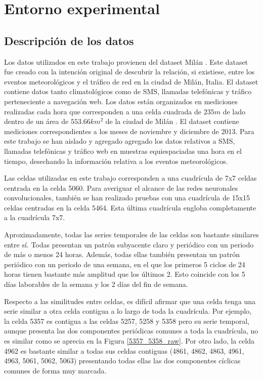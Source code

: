 \chapter{Entorno experimental}
\label{cap7:entorno}
\section{Descripción de los datos}
Los datos utilizados en este trabajo provienen del dataset Milán \cite{milandataset}. Este dataset fue creado con la intención original de descubrir la relación, si existiese, entre los eventos meteorológicos y el tráfico de red en la ciudad de Milán, Italia. El dataset contiene datos tanto climatológicos como de SMS, llamadas telefónicas y tráfico perteneciente a navegación web. Los datos están organizados en mediciones realizadas cada hora que corresponden a una celda cuadrada de $235 m$ de lado dentro de un área de $553.66km^2$ de la ciudad de Milán \cite{milanogrid}. El dataset contiene mediciones correspondientes a los meses de noviembre y diciembre de 2013. Para este trabajo se han aislado y agregado agregado los datos relativos a SMS, llamadas telefónicas y tráfico web en muestras equiespaciadas una hora en el tiempo, desechando la información relativa a los eventos meteorológicos.

Las celdas utilizadas en este trabajo corresponden a una cuadrícula de 7x7 celdas centrada en la celda 5060. Para averiguar el alcance de las redes neuronales convolucionales, también se han realizado pruebas con una cuadrícula de 15x15 celdas centradas en la celda 5464. Esta última cuadrícula engloba completamente a la cuadrícula 7x7.

Aproximadamente, todas las series temporales de las celdas son bastante similares entre sí. Todas presentan un patrón subyacente claro y periódico con un periodo de más o menos 24 horas. Además, todas ellas también presentan un patrón periódico con un periodo de una semana, en el que los primeros 5 ciclos de 24 horas tienen bastante más amplitud que los últimos 2. Esto coincide con los 5 días laborables de la semana y los 2 días del fin de semana.

Respecto a las similitudes entre celdas, es difícil afirmar que una celda tenga una serie similar a otra celda contigua a lo largo de toda la cuadrícula. Por ejemplo, la celda 5357 es contigua a las celdas 5257, 5258 y 5358 pero su serie temporal, aunque presenta las dos componentes periódicas comunes a toda la cuadrícula, no es similar como se aprecia en la Figura  \ref{5357_5358_raw}. Por otro lado, la celda 4962 es bastante similar a todas sus celdas contiguas (4861, 4862, 4863, 4961, 4963, 5061, 5062, 5063) presentando todas ellas las dos componentes cíclicas comunes de forma muy marcada.

